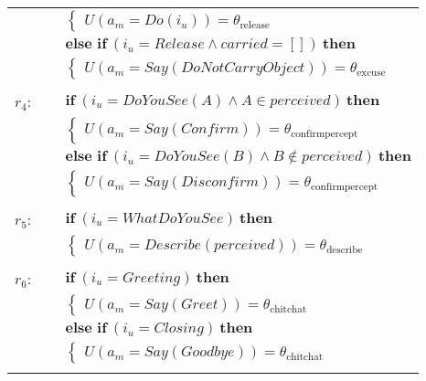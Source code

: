 \begin{footnotesize}
\begin{longtable}{p{2cm}l}
 & \;\;\;\;\; $ \begin{cases}U(\mathit{a_m}\!=\!\mathit{Do({i_u})})\!=\!\theta_{\mathrm{release}} \end{cases}$\\[3mm] & $ \textbf{else if} \ (\mathit{i_u}\!=\!\mathit{Release} \land \mathit{carried}\!=\!\mathit{[]}) \ \textbf{then}$ \\
& \;\;\;\;\; $ \begin{cases}U(\mathit{a_m}\!=\!\mathit{Say(DoNotCarryObject)})\!=\!\theta_{\mathrm{excuse}} \end{cases}$ \\ \\[-2mm]
$r_{4}$: \ \ & $ \textbf{if} \ (\mathit{i_u}\!=\!\mathit{DoYouSee({A})} \land \mathit{{A}}\!\in\!\mathit{perceived}) \ \textbf{then} $ \\
 & \;\;\;\;\; $ \begin{cases}U(\mathit{a_m}\!=\!\mathit{Say(Confirm)})\!=\!\theta_{\mathrm{confirmpercept}} \end{cases}$\\[3mm] & $ \textbf{else if} \ (\mathit{i_u}\!=\!\mathit{DoYouSee({B})} \land \mathit{{B}}\!\notin\!\mathit{perceived}) \ \textbf{then}$ \\
& \;\;\;\;\; $ \begin{cases}U(\mathit{a_m}\!=\!\mathit{Say(Disconfirm)})\!=\!\theta_{\mathrm{confirmpercept}} \end{cases}$ \\ \\[-2mm]
$r_{5}$: \ \ & $ \textbf{if} \ (\mathit{i_u}\!=\!\mathit{WhatDoYouSee}) \ \textbf{then} $ \\
 & \;\;\;\;\; $ \begin{cases}U(\mathit{a_m}\!=\!\mathit{Describe({perceived})})\!=\!\theta_{\mathrm{describe}} \end{cases}$ \\ \\[-2mm]
$r_{6}$: \ \ & $ \textbf{if} \ (\mathit{i_u}\!=\!\mathit{Greeting}) \ \textbf{then} $ \\
 & \;\;\;\;\; $ \begin{cases}U(\mathit{a_m}\!=\!\mathit{Say(Greet)})\!=\!\theta_{\mathrm{chitchat}} \end{cases}$\\[3mm] & $ \textbf{else if} \ (\mathit{i_u}\!=\!\mathit{Closing}) \ \textbf{then}$ \\
& \;\;\;\;\; $ \begin{cases}U(\mathit{a_m}\!=\!\mathit{Say(Goodbye)})\!=\!\theta_{\mathrm{chitchat}} \end{cases}$ \\ \\[-2mm]

\end{longtable}
\end{footnotesize}
